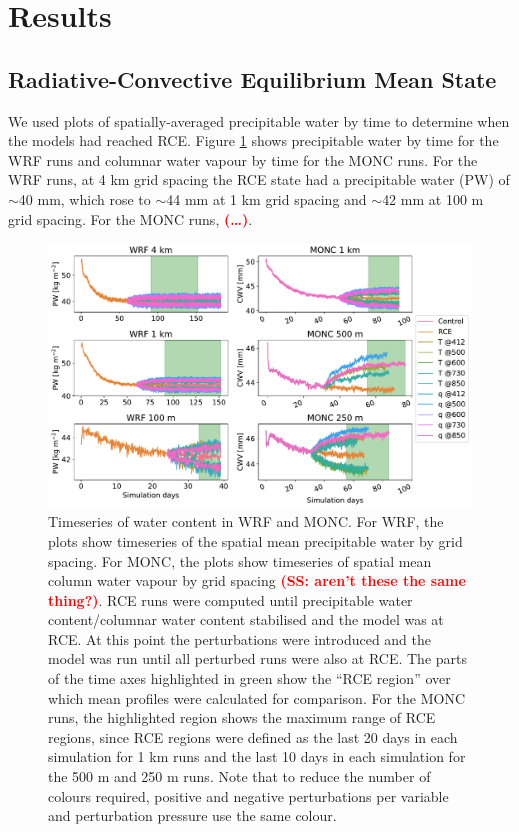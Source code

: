 \documentclass[draft]{agujournal2019}
\newcommand{\todo}[1]{\textcolor{red}{\textbf{(#1)}}}
\begin{document}
\section{Results}
\label{sec:results}

\subsection{Radiative-Convective Equilibrium Mean State}

We used plots of spatially-averaged precipitable water by time to determine when
the models had reached RCE. Figure \ref{fig:rce_pw} shows precipitable water by
time for the WRF runs and columnar water vapour by time for the MONC runs. For
the WRF runs, at 4 km grid spacing the RCE state had a precipitable water (PW)
of $\sim$40 mm, which rose to $\sim$44 mm at 1 km grid spacing and $\sim$42 mm
at 100 m grid spacing. For the MONC runs, \todo{\ldots}.

\begin{figure}[pth]
    \noindent\includegraphics[width=\textwidth]{figures/runs_timeseries.pdf}
    \caption{Timeseries of water content in WRF and MONC. For WRF, the plots
    show timeseries of the spatial mean precipitable water by grid spacing. For
    MONC, the plots show timeseries of spatial mean column water vapour by grid
    spacing \todo{SS: aren't these the same thing?}. RCE runs were computed until precipitable water content/columnar water content stabilised and the model was at RCE. At this point the
    perturbations were introduced and the model was run until all perturbed runs
    were also at RCE. The parts of the time axes highlighted in green show the
    ``RCE region'' over which mean profiles were calculated for comparison. For
    the MONC runs, the highlighted region shows the maximum range of RCE
    regions, since RCE regions were defined as the last 20 days in each
    simulation for 1 km runs and the last 10 days in each simulation for the 500
    m and 250 m runs. Note that to reduce the number of colours required,
    positive and negative perturbations per variable and perturbation pressure
    use the same colour.}
    \label{fig:rce_pw}
\end{figure}
\end{document}
